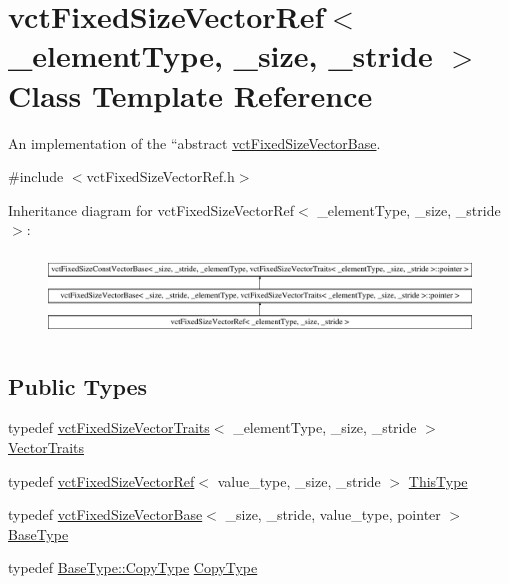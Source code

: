 \hypertarget{classvct_fixed_size_vector_ref}{}\section{vct\+Fixed\+Size\+Vector\+Ref$<$ \+\_\+element\+Type, \+\_\+size, \+\_\+stride $>$ Class Template Reference}
\label{classvct_fixed_size_vector_ref}


An implementation of the ``abstract\textquotesingle{}\textquotesingle{} \hyperlink{classvct_fixed_size_vector_base}{vct\+Fixed\+Size\+Vector\+Base}.  




{\ttfamily \#include $<$vct\+Fixed\+Size\+Vector\+Ref.\+h$>$}

Inheritance diagram for vct\+Fixed\+Size\+Vector\+Ref$<$ \+\_\+element\+Type, \+\_\+size, \+\_\+stride $>$\+:\begin{figure}[H]
\begin{center}
\leavevmode
\includegraphics[height=2.213439cm]{df/de2/classvct_fixed_size_vector_ref}
\end{center}
\end{figure}
\subsection*{Public Types}
\begin{DoxyCompactItemize}
\item 
typedef \hyperlink{classvct_fixed_size_vector_traits}{vct\+Fixed\+Size\+Vector\+Traits}$<$ \+\_\+element\+Type, \+\_\+size, \+\_\+stride $>$ \hyperlink{classvct_fixed_size_vector_ref_a9061c9a151a2e67a207cdff219e165b4}{Vector\+Traits}
\item 
typedef \hyperlink{classvct_fixed_size_vector_ref}{vct\+Fixed\+Size\+Vector\+Ref}$<$ value\+\_\+type, \+\_\+size, \+\_\+stride $>$ \hyperlink{classvct_fixed_size_vector_ref_a3fc8fbdfc7492a38119e7ed7ef5bc289}{This\+Type}
\item 
typedef \hyperlink{classvct_fixed_size_vector_base}{vct\+Fixed\+Size\+Vector\+Base}$<$ \+\_\+size, \+\_\+stride, value\+\_\+type, pointer $>$ \hyperlink{classvct_fixed_size_vector_ref_a333e56f4164c12e33aff3e491d4fb879}{Base\+Type}
\item 
typedef \hyperlink{classvct_fixed_size_vector_base_a136da6f4bb90964f3f156533f85416d9}{Base\+Type\+::\+Copy\+Type} \hyperlink{classvct_fixed_size_vector_ref_a43b5dfaa1ac96d6e47aaa9e44b4d7f92}{Copy\+Type}
\end{DoxyCompactItemize}
